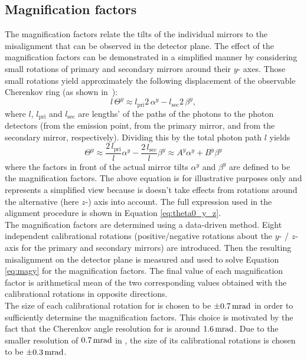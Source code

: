 \subsection{Magnification factors}
\label{subsec:Magnification}
The magnification factors relate the tilts of the individual mirrors to the misalignment that can be observed in the detector plane. The effect of the magnification factors can be demonstrated in a simplified manner  by considering small rotations of primary and secondary mirrors around their $y$- axes. Those small rotations yield approximately the following displacement of the observable Cherenkov ring (as shown in~):
\begin{equation}
l\,\varTheta^y \approx l_{\mathrm{pri}}2\,\alpha^y
                       - l_{\mathrm{sec}}2\, \beta^y,
\end{equation}
where $l$, $l_{\mathrm{pri}}$ and $l_{\mathrm{sec}}$ are lengths' of the paths of the photons to the photon detectors (from the emission point, from the primary mirror, and from the secondary mirror, respectively). Dividing this by the total photon path $l$ yields
\begin{equation}
\label{eq:magy}
  \varTheta^y  \approx \dfrac{2\,l_{\mathrm{pri}}}{l}\alpha^y
                     - \dfrac{2\,l_{\mathrm{sec}}}{l} \beta^y
               \approx                            A^y\alpha^y
                                                + B^y \beta^y
\end{equation}
where the factors in front of the actual mirror tilts $\alpha^y$ and $\beta^y$ are defined to be the magnification factors. The above equation is for illustrative purposes only and represents a simplified view because is doesn't take effects from rotations around the alternative (here $z$-) axis into account. The full expression used in the alignment procedure is shown in Equation \ref{eq:theta0_y_z}.\\
The magnification factors are determined using a data-driven method. Eight independent calibrational rotations (positive/negative rotations about the $y$- / $z$- axis for the primary and secondary mirrors) are introduced. Then the resulting misalignment on the detector plane is measured and used to solve Equation \ref{eq:magy} for the magnification factors. The final value of each magnification factor is arithmetical mean of the two corresponding values obtained with the calibrational rotations in opposite directions.\\
The size of each calibrational rotation for \richone is chosen to be $\pm0.7\rm \,mrad$ in order to sufficiently determine the magnification factors. This choice is motivated by the fact that the Cherenkov angle resolution for \richone is around $1.6\rm \,mrad$. Due to the smaller resolution of $0.7\rm \,mrad$ in \richtwo, the size of its calibrational rotations is chosen to be $\pm0.3\rm \,mrad$.\\


